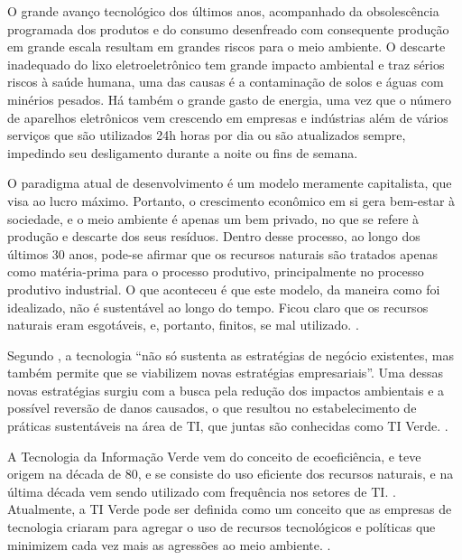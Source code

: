 O grande avanço tecnológico dos últimos anos, acompanhado da obsolescência programada dos produtos e do consumo desenfreado com consequente produção em grande escala resultam em grandes riscos para o meio ambiente. O descarte inadequado do lixo eletroeletrônico tem grande impacto ambiental e traz sérios riscos à saúde humana, uma das causas é a contaminação de solos e águas com minérios pesados. Há também o grande gasto de energia, uma vez que o número de aparelhos eletrônicos vem crescendo em empresas e indústrias além de vários serviços que são utilizados 24h horas por dia ou são atualizados sempre, impedindo seu desligamento durante a noite ou fins de semana.

\begin{citacao}
O paradigma atual de desenvolvimento é um modelo meramente capitalista, que visa ao lucro máximo. Portanto, o crescimento econômico em si gera bem-estar à sociedade, e o meio ambiente é apenas um bem privado, no que se refere à produção e descarte dos seus resíduos. Dentro desse processo, ao longo dos últimos 30 anos, pode-se afirmar que os recursos naturais são tratados apenas como matéria-prima para o processo produtivo, principalmente no processo produtivo industrial. O que aconteceu é que este modelo, da maneira como foi idealizado, não é sustentável ao longo do tempo. Ficou claro que os recursos naturais eram esgotáveis, e, portanto, finitos, se mal utilizado. \cite{kraemer2005responsabilidade}.
\end{citacao} 

Segundo , a tecnologia “não só sustenta as estratégias de negócio existentes, mas também permite que se viabilizem novas estratégias empresariais”. Uma dessas novas estratégias surgiu com a busca pela redução dos impactos ambientais e a possível reversão de danos causados, o que resultou no estabelecimento de práticas sustentáveis na área de TI, que juntas são conhecidas como TI Verde. \cite{aguilar2009tecnologia}.

A Tecnologia da Informação Verde vem do conceito de ecoeficiência, e teve origem na década de 80, e se consiste do uso eficiente dos recursos naturais, e na última década vem sendo utilizado com frequência nos setores de TI. \cite{ferreira2009tiverde}. Atualmente, a TI Verde pode ser definida como um conceito que as empresas de tecnologia criaram para agregar o uso de recursos tecnológicos e políticas que minimizem cada vez mais as agressões ao meio ambiente. \cite{briefing2008preciso}.


